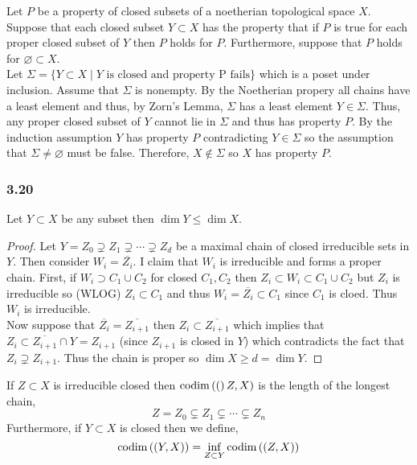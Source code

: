 \documentclass[12pt]{article}
\begin{document}
Let $P$ be a property of closed subsets of a noetherian topological space $X$. Suppose that each closed subset $Y \subset X$ has the property that if $P$ is true for each proper closed subset of $Y$ then $P$ holds for $P$. Furthermore, suppose that $P$ holds for $\varnothing \subset X$.
\bigskip\\
Let $\Sigma = \{ Y \subset X \mid Y \text{ is closed and property P fails} \}$ which is a poset under inclusion. Assume that $\Sigma$ is nonempty. By the Noetherian propery all chains have a least element and thus, by Zorn's Lemma, $\Sigma$ has a least element $Y \in \Sigma$. Thus, any proper closed subset of $Y$ cannot lie in $\Sigma$ and thus has property $P$. By the induction assumption $Y$ has property $P$ contradicting $Y \in \Sigma$ so the assumption that $\Sigma \neq \varnothing$ must be false. Therefore, $X \notin \Sigma$ so $X$ has property $P$.

\subsubsection{3.20}

\begin{lemma}
Let $Y \subset X$ be any subset then $\dim{Y} \le \dim{X}$. 
\end{lemma}

\begin{proof}
Let $Y = Z_0 \supsetneq Z_1 \supsetneq \cdots \supsetneq Z_d$ be a maximal chain of closed irreducible sets in $Y$. Then consider $W_i = \overline{Z_i}$. I claim that $W_i$ is irreducible and forms a proper chain. First, if $W_i \supset C_1 \cup C_2$ for closed $C_1, C_2$ then $Z_i \subset W_i \subset C_1 \cup C_2$ but $Z_i$ is irreducible so (WLOG) $Z_i \subset C_1$ and thus $W_i = \overline{Z_i} \subset C_1$ since $C_1$ is cloed. Thus $W_i$ is irreducible. 
\bigskip\\
Now suppose that $\overline{Z_i} = \overline{Z_{i+1}}$ then $Z_i \subset \overline{Z_{i+1}}$ which implies that $Z_i \subset \overline{Z_{i + 1}} \cap Y = Z_{i + 1}$ (since $Z_{i + 1}$ is closed in $Y$) which contradicts the fact that $Z_i \supsetneq Z_{i+1}$. Thus the chain is proper so $\dim{X} \ge d = \dim{Y}$.  
\end{proof}

\begin{definition}
If $Z \subset X$ is irreducible closed then $\mathrm{codim}\left( ( \right)Z,X)$ is the length of the longest chain,
\[ Z = Z_0 \subsetneq Z_1 \subsetneq \cdots \subsetneq Z_n \]
Furthermore, if $Y \subset X$ is closed then we define,
\[ \mathrm{codim}\left( (Y, X) \right) = \inf_{Z \subset Y} \mathrm{codim}\left( (Z, X) \right) \]
\end{definition}
\end{document}

